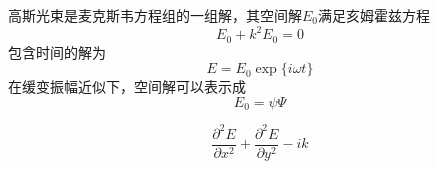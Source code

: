 

高斯光束是麦克斯韦方程组的一组解，其空间解$E_0$满足亥姆霍兹方程
\begin{equation}
E_0 + k^2E_0=0
\end{equation}
包含时间的解为
\begin{equation}
E=E_0\exp\{i\omega t\}
\end{equation}
在缓变振幅近似下，空间解可以表示成
\begin{equation}
E_0=\psi\Psi

\end{equation}


\begin{equation}
\frac{\partial^2 E}{\partial x^2} +\frac{\partial^2 E}{\partial y^2} -ik 
\end{equation}
